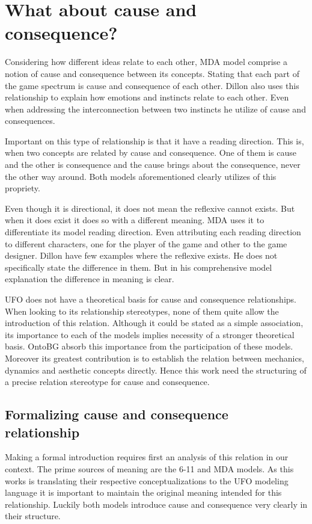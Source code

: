 \section{What about cause and consequence?}

Considering how different ideas relate to each other, MDA model comprise a notion of cause and consequence between its concepts. Stating that each part of the game spectrum is cause and consequence of each other. Dillon also uses this relationship to explain how emotions and instincts relate to each other. Even when addressing the interconnection between two instincts he utilize of cause and consequences.

Important on this type of relationship is that it have a reading direction. This is, when two concepts are related by cause and consequence. One of them is cause and the other is consequence and the cause brings about the consequence, never the other way around. Both models aforementioned clearly utilizes of this propriety. 

Even though it is directional, it does not mean the reflexive cannot exists. But when it does exist it does so with a different meaning. MDA uses it to differentiate its model reading direction. Even attributing each reading direction to different characters, one for the player of the game and other to the game designer. Dillon have few examples where the reflexive exists. He does not specifically state the difference in them. But in his comprehensive model explanation the difference in meaning is clear.

UFO does not have a theoretical basis for cause and consequence relationships. When looking to its relationship stereotypes, none of them quite allow the introduction of this relation. Although it could be stated as a simple association, its importance to each of the models implies necessity of a stronger theoretical basis. OntoBG absorb this importance from the participation of these models. Moreover its greatest contribution is to establish the relation between mechanics, dynamics and aesthetic concepts directly. Hence this work need the structuring of a precise relation stereotype for cause and consequence.

\subsection{Formalizing cause and consequence relationship}

Making a formal introduction requires first an analysis of this relation in our context. The prime sources of meaning are the 6-11 and MDA models. As this works is translating their respective conceptualizations to the UFO modeling language it is important to maintain the original meaning intended for this relationship. Luckily both models introduce cause and consequence very clearly in their structure. 

